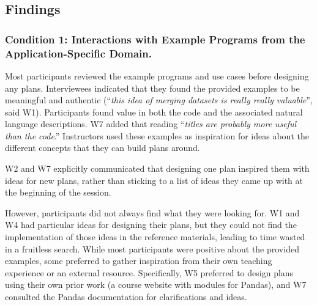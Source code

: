 \subsection{Findings}
\label{sec:design-workshop-findings}

\subsubsection{Condition 1: Interactions with Example Programs from the Application-Specific Domain.}
Most participants reviewed the example programs and use cases before designing any plans. Interviewees indicated that they found the provided examples to be meaningful and authentic (``\textit{this idea of merging datasets is really really valuable}'', said W1). Participants found value in both the code and the associated natural language descriptions. W7 added that reading ``\textit{titles are probably more useful than the code}.'' Instructors used these examples as inspiration for ideas about the different concepts that they can build plans around.

W2 and W7 explicitly communicated that designing one plan inspired them with ideas for new plans, rather than sticking to a list of ideas they came up with at the beginning of the session. %

However, participants did not always find what they were looking for. W1 and W4 had particular ideas for designing their plans, but they could not find the implementation of those ideas in the reference materials, leading to time wasted in a fruitless search. While most participants were positive about the provided examples, some preferred to gather inspiration from their own teaching experience or an external resource. Specifically, W5 preferred to design plans using their own prior work (a course website with modules for Pandas), and W7 consulted the Pandas documentation for clarifications and ideas. 

